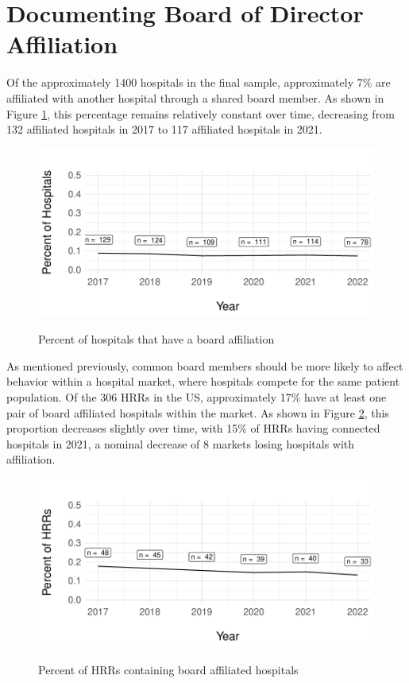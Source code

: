 \documentclass[12pt]{article}
\begin{document}
    \section{Documenting Board of Director Affiliation}


    Of the approximately 1400 hospitals in the final sample, approximately 7\% are affiliated with another hospital through a shared board member. As shown in Figure \ref{fig:connected_percent}, this percentage remains relatively constant over time, decreasing from 132 affiliated hospitals in 2017 to 117 affiliated hospitals in 2021. 

    \begin{figure}[ht!]
        \centering
        \caption{Percent of hospitals that have a board affiliation}
        \includegraphics[width=.8\textwidth]{Objects/connected_percent.pdf}
        \label{fig:connected_percent}
    \end{figure}

    As mentioned previously, common board members should be more likely to affect behavior within a hospital market, where hospitals compete for the same patient population. Of the 306 HRRs in the US, approximately 17\% have at least one pair of board affiliated hospitals within the market. As shown in Figure \ref{fig:connected_HRR_percent}, this proportion decreases slightly over time, with 15\% of HRRs having connected hospitals in 2021, a nominal decrease of 8 markets losing hospitals with affiliation.  


    \begin{figure}[ht!]
        \centering
        \caption{Percent of HRRs containing board affiliated hospitals}
        \includegraphics[width=.8\textwidth]{Objects/connected_HRR_percent.pdf}
        \label{fig:connected_HRR_percent}
    \end{figure}
\end{document}
